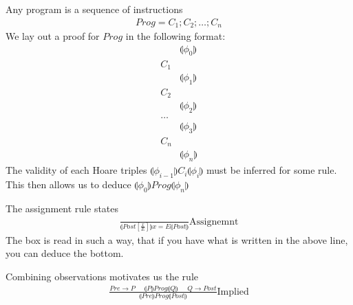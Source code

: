 \documentclass[a4paper]{article}
\theoremstyle{plain}
\theoremstyle{definition}
\newtheorem{defn}{Definition}[section]
\theoremstyle{remark}
\begin{document}
\begin{tcolorbox}[colback=black!3!white,colframe=black!60!white,title=\begin{defn}Hoare Logic \label{Hoare Logic}\end{defn}]
Any program is a sequence of instructions
\begin{align}
Prog = C_1;C_2;\ldots;C_n
\end{align}
We lay out a proof for $Prog$ in the following format:
\begin{align}
	&\llparenthesis \phi_0 \rrparenthesis \\
	C_1 & \\
	&\llparenthesis \phi_1 \rrparenthesis \\
	C_2 & \\
	&\llparenthesis \phi_2 \rrparenthesis \\
	\ldots & \\
	&\llparenthesis \phi_3 \rrparenthesis \\
	C_n & \\
	&\llparenthesis \phi_n \rrparenthesis 
\end{align}
The validity of each Hoare triples $\llparenthesis \phi_{i-1} \rrparenthesis C_i \llparenthesis \phi_i \rrparenthesis$ must be inferred for some rule. This then allows us to deduce $\llparenthesis \phi_0 \rrparenthesis Prog \llparenthesis \phi_n \rrparenthesis$
\end{tcolorbox}
\begin{tcolorbox}[colback=black!3!white,colframe=black!60!white,title=\begin{defn}Assignment Rule \label{Assignment Rule}\end{defn}]
The assignment rule states
\begin{align}
\frac{}{\llparenthesis Post[\frac{x}{E}]\rrparenthesis x = E \llparenthesis Post \rrparenthesis}	\text{Assignemnt}
\end{align}
The box is read in such a way, that if you have what is written in the above line, you can deduce the bottom.
\end{tcolorbox}
\begin{tcolorbox}[colback=black!3!white,colframe=black!60!white,title=\begin{defn}Implied Rule \label{Implied Rule}\end{defn}]
Combining observations motivates us the rule
\begin{align}
\frac{Pre \to  P \; \;\; \; \; \llparenthesis P \rrparenthesis Prog \llparenthesis Q \rrparenthesis \; \; \; \;\; Q \to  Post}{\llparenthesis Pre \rrparenthesis Prog \llparenthesis Post \rrparenthesis} \text{Implied}
\end{align}
\end{tcolorbox}
\end{document}
